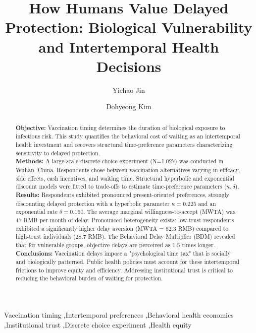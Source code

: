 \documentclass[preprint,12pt,authoryear]{elsarticle}
\begin{document}
\begin{frontmatter}

\title{How Humans Value Delayed Protection: Biological Vulnerability and Intertemporal Health Decisions}

\author[1]{Yichao Jin}
\author[1]{Dohyeong Kim}
\address[1]{School of Economic, Political and Policy Sciences, The University of Texas at Dallas, Richardson, TX, USA}

\begin{abstract}
\noindent \textbf{Objective:} Vaccination timing determines the duration of biological exposure to infectious risk. This study quantifies the behavioral cost of waiting as an intertemporal health investment and recovers structural time-preference parameters characterizing sensitivity to delayed protection.\\
\textbf{Methods:} A large-scale discrete choice experiment (N=1,027) was conducted in Wuhan, China. Respondents chose between vaccination alternatives varying in efficacy, side effects, cash incentives, and waiting time. Structural hyperbolic and exponential discount models were fitted to trade-offs to estimate time-preference parameters ($\kappa, \delta$).\\
\textbf{Results:} Respondents exhibited pronounced present-oriented preferences, strongly discounting delayed protection with a hyperbolic parameter $\kappa = 0.225$ and an exponential rate $\delta = 0.160$. The average marginal willingness-to-accept (MWTA) was 47 RMB per month of delay. Pronounced heterogeneity exists: low-trust respondents exhibited a significantly higher delay aversion (MWTA = 62.3 RMB) compared to high-trust individuals (28.7 RMB). The Behavioral Delay Multiplier (BDM) revealed that for vulnerable groups, objective delays are perceived as 1.5 times longer.\\
\textbf{Conclusions:} Vaccination delays impose a "psychological time tax" that is socially and biologically patterned. Public health policies must account for these intertemporal frictions to improve equity and efficiency. Addressing institutional trust is critical to reducing the behavioral burden of waiting for protection.
\end{abstract}

\begin{keyword}
Vaccination timing \sep Intertemporal preferences \sep Behavioral health economics \sep Institutional trust \sep Discrete choice experiment \sep Health equity
\end{keyword}

\end{frontmatter}
\end{document}
